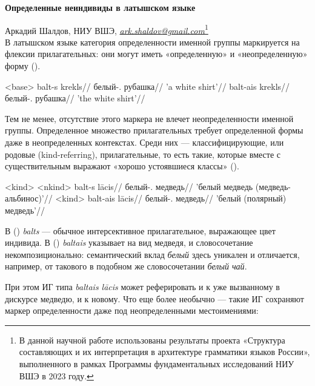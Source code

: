 \documentclass[a4paper, 12pt]{article}
\begin{document}


\textbf{Определенные неиндивиды в латышском языке}

Аркадий Шалдов, НИУ ВШЭ, \textit{\href{mailto:ark.shaldov@gmail.com}{ark.shaldov@gmail.com}}\footnote{В данной научной работе использованы результаты проекта «Структура составляющих и их интерпретация в архитектуре грамматики языков России», выполненного в рамках Программы фундаментальных исследований НИУ ВШЭ в 2023 году.}\\

В латышском языке категория определенности именной группы маркируется на флексии прилагательных: они могут иметь «определенную» и «неопределенную» форму (\nextx).

\pex<base>
    \a \begingl
        \gla balt-s krekls//
        \glb белый-\M{}.\Indef{} рубашка//
        \glft 'a white shirt'//
    \endgl
    \a \begingl
        \gla balt-ais krekls//
        \glb белый-\M{}.\Def{} рубашка//
        \glft 'the white shirt'//
    \endgl
\xe

Тем не менее, отсутствие этого маркера не влечет неопределенности именной группы. Определенное множество прилагательных требует определенной формы даже в неопределенных контекстах. Среди них --- классифицирующие, или родовые (kind-referring), прилагательные, то есть такие, которые вместе с существительным выражают «хорошо устоявшиеся классы» \citep{carlson1977, trugman2005} (\nextx).

\pex<kind>
    \a<nkind> \begingl
        \gla balt-s lācis//
        \glb белый-\M.\Indef{} медведь//
        \glft 'белый медведь (медведь-альбинос)'//
    \endgl 
    \a<kind> \begingl
        \gla balt-ais lācis//
        \glb белый-\M.\Def{} медведь//
        \glft 'белый (полярный) медведь'//
    \endgl
\xe

В () \textit{balts} --- обычное интерсективное прилагательное, выражающее цвет индивида. В () \textit{baltais} указывает на вид медведя, и словосочетание некомпозиционально: семантический вклад \textit{белый} здесь уникален и отличается, например, от такового в подобном же словосочетании \textit{белый чай}.

При этом ИГ типа \textit{baltais lācis} может реферировать и к уже вызванному в дискурсе медведю, и к новому. Что еще более необычно --- такие ИГ сохраняют маркер определенности даже под неопределенными местоимениями:
\end{document}
